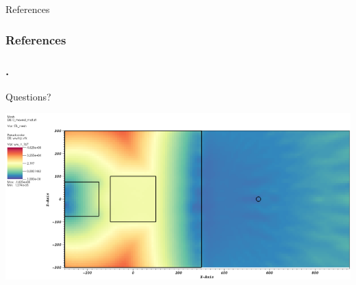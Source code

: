 \documentclass{beamer}
\begin{document}
\begin{frame}{References}

        \tiny
        \frametitle{References}
        
        \color{black}
        
\end{frame}

\begin{frame}[c]
	\frametitle{\tiny{.}}
        \centering
        \Huge{Questions?}
	\begin{center}
        \vspace{1cm}
	\includegraphics[scale=0.32]{ww_mesh.png}
	\end{center}
\end{frame}

%
%
\end{document}
